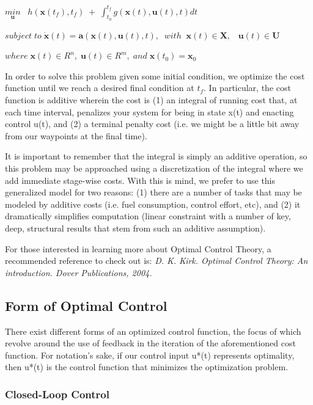 \documentclass[twoside]{article}
\begin{document}
\begin{center}
$
\underset{\mathbf{u}}{min}\;\;\; h( \mathbf{x}(t_{f}),t_{f})\;+\;\int_{t_0}^{t_f}g(\mathbf{x}(t),\mathbf{u}(t),t)dt
$

$
subject\;to\;\dot{\mathbf{x}}(t)=\mathbf{a}(\mathbf{x}(t),\mathbf{u}(t),t),\;\;with\;\;\mathbf{x}(t)\in \boldsymbol{X},\;\;\;\mathbf{u}(t)\in \boldsymbol{U} 
$

$
where\;\boldsymbol{x}(t)\in R^{n}, \; \boldsymbol{u}(t)\in R^{m}, \;and\; \boldsymbol{x}(t_0)=\boldsymbol{x}_0
$
\end{center}

In order to solve this problem given some initial condition, we optimize the cost function until we reach a desired final condition at $t_f$. In particular, the cost function is additive wherein the cost is (1) an integral of running cost that, at each time interval, penalizes your system for being in state x(t) and enacting control u(t), and (2) a terminal penalty cost (i.e. we might be a little bit away from our waypoints at the final time).

It is important to remember that the integral is simply an additive operation, so this problem may be approached using a discretization of the integral where we add immediate stage-wise costs. With this is mind, we prefer to use this generalized model for two reasons: (1) there are a number of tasks that may be modeled by additive costs (i.e. fuel consumption, control effort, etc), and (2) it dramatically simplifies computation (linear constraint with a number of key, deep, structural results that stem from such an additive assumption).

For those interested in learning more about Optimal Control Theory, a recommended reference to check out is: \textit{D. K. Kirk. Optimal Control Theory: An introduction. Dover Publications, 2004.}

\subsection*{Form of Optimal Control}

There exist different forms of an optimized control function, the focus of which revolve around the use of feedback in the iteration of the aforementioned cost function. For notation's sake, if our control input u*(t) represents optimality, then u*(t) is the control function that minimizes the optimization problem. 

\subsubsection*{Closed-Loop Control}
\end{document}
